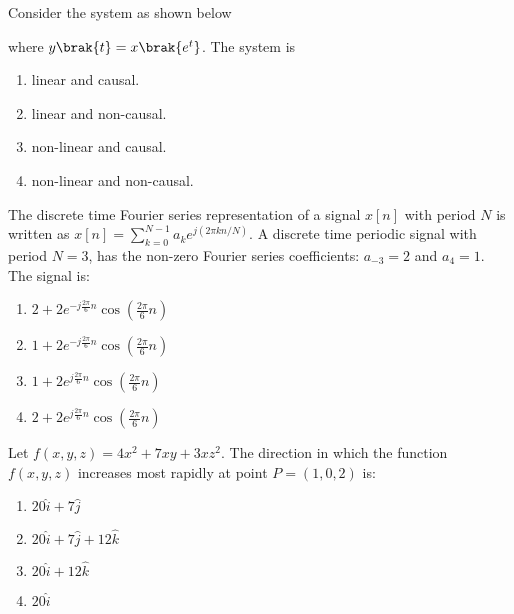 \item Consider the system as shown below
\begin{figure}[!ht]
\centering
{}%

\label{fig:my_label}
\end{figure}
where $y\brak{t} = x\brak{e^t}$. The system is
\begin{enumerate}
    \item linear and causal.
    \item linear and non-causal. 
    \item non-linear and causal. 
    \item non-linear and non-causal.
\end{enumerate}

\item The discrete time Fourier series representation of a signal $x[n]$ with period $N$ is written as  $x[n] = \sum_{k=0}^{N-1} a_k e^{j(2\pi kn / N)}.$ A discrete time periodic signal with period $N=3$, has the non-zero Fourier series coefficients: $a_{-3} = 2$ and $a_4 = 1$. The signal is:
\begin{enumerate}
    \item $2 + 2e^{-j\frac{2\pi}{6}n} \cos\left(\frac{2\pi}{6}n\right)$
    \item $1 + 2e^{-j\frac{2\pi}{6}n} \cos\left(\frac{2\pi}{6}n\right)$
    \item $1 + 2e^{j\frac{2\pi}{6}n} \cos\left(\frac{2\pi}{6}n\right)$
    \item $2 + 2e^{j\frac{2\pi}{6}n} \cos\left(\frac{2\pi}{6}n\right)$
\end{enumerate}

\item Let $f(x, y, z) = 4x^2 + 7xy + 3xz^2$. The direction in which the function $f(x, y, z)$ increases most rapidly at point $P = (1, 0, 2)$ is:
\begin{enumerate}
    \item $20\hat{i} + 7\hat{j}$
    \item $20\hat{i} + 7\hat{j} + 12\hat{k}$
    \item $20\hat{i} + 12\hat{k}$
    \item $20\hat{i}$
\end{enumerate}

